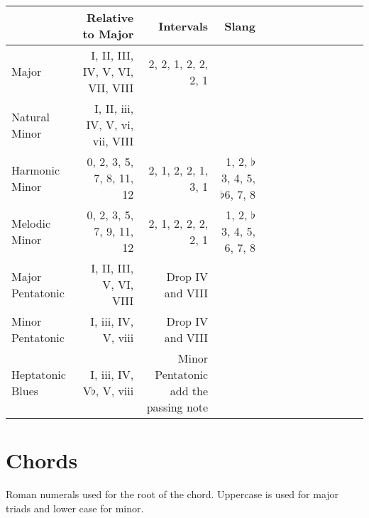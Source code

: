 \documentclass[a4paper]{scrartcl}
\begin{document}
\begin{tabular}
{| l | r | r | r | c | c | c | c | c | c | c | c | c | } \hline
& Relative to Major & Intervals & Slang\\ \hline
Major &  I, II, III, IV, V, VI, VII, VIII & 2, 2, 1, 2, 2, 2, 1\\ \hline
Natural Minor & I, II, iii, IV, V, vi, vii, VIII\\ \hline 
Harmonic Minor & 0, 2, 3, 5, 7, 8, 11, 12 & 2, 1, 2, 2, 1, 3, 1 & 
1, 2, $\flat$3, 4, 5, $\flat$6, 7, 8 \\ \hline 
Melodic Minor & 0, 2, 3, 5, 7, 9, 11, 12 & 2, 1, 2, 2, 2, 2, 1 & 
1, 2, $\flat$3, 4, 5, 6, 7, 8 \\ \hline 
Major Pentatonic & I, II, III, V, VI, VIII & Drop IV and VIII \\ \hline
Minor Pentatonic & I, iii, IV, V, viii & Drop IV and VIII \\ \hline
Heptatonic Blues & I, iii, IV, V$\flat$, V, viii & Minor Pentatonic add the passing note \\ \hline
\end{tabular}



\section{Chords}
Roman numerals used for the root of the chord. Uppercase is used for major triads and lower case for minor.
\\
\end{document}
